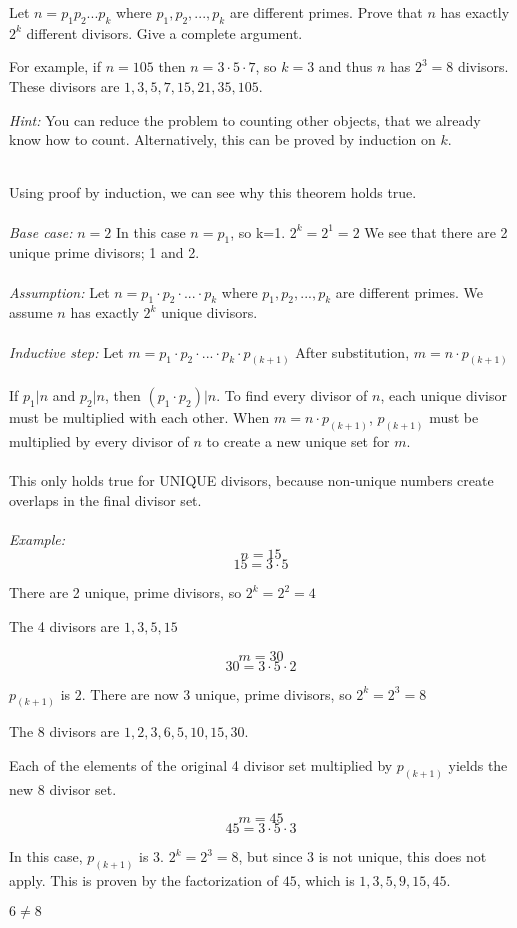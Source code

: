 

\begin{problem}
Let $n = p_1p_2...p_k$ where $p_1,p_2,...,p_k$ are different primes.	
Prove that $n$ has exactly $2^k$ different divisors. Give a complete argument.

For example, if $n =105$ then $n = 3\cdot 5 \cdot 7$, so $k=3$ and
thus $n$ has $2^3 = 8$ divisors. These divisors are $1,3,5,7,15,21,35,105$.

\emph{Hint:} You can reduce the problem to counting other objects, that we already
know how to count. Alternatively, this can be proved by induction on $k$.
\end{problem}

\begin{solution}
\\
Using proof by induction, we can see why this theorem holds true.
\\
\\
\emph{Base case:} $n=2$
In this case $n=p_1$, so k=1. $2^k = 2^1 = 2$ We see that there are 2 unique prime
divisors; 1 and 2.
\\
\\
\emph{Assumption: } Let $n = p_1 \cdot p_2 \cdot ... \cdot p_k$ where $p_1,p_2,...,p_k$ are different primes.
We assume $n$ has exactly $2^k$ unique divisors.
\\
\\
\emph{Inductive step: } Let $m = p_1 \cdot p_2 \cdot ... \cdot p_k \cdot p_{(k+1)}$
After substitution, $m = n \cdot p_{(k+1)}$
\\
\\
If $p_1 | n$ and $p_2 | n$, then $(p_1 \cdot p_2) | n$. To find every divisor of $n$, each unique divisor
must be multiplied with each other. When $m = n \cdot p_{(k+1)}$, $p_{(k+1)}$ must be multiplied by every
divisor of $n$ to create a new unique set for $m$.
\\
\\
This only holds true for UNIQUE divisors, because non-unique numbers create overlaps in the final divisor set.
\\
\\
\emph{Example:} 
\[n=15 \]
\[ 15 = 3 \cdot 5 \]

There are 2 unique, prime divisors, so $2^k = 2^2 = 4$

The 4 divisors are $1, 3, 5, 15$

\[m=30 \]
\[ 30 = 3 \cdot 5 \cdot 2 \]

$p_{(k+1)}$ is $2$. There are now 3 unique, prime divisors, so $2^k = 2^3 = 8$

The 8 divisors are $1, 2, 3, 6, 5, 10, 15, 30$.

Each of the elements of the original 4 divisor set multiplied by $p_{(k+1)}$ yields the new 8 divisor set.

\[m=45 \]
\[45 = 3 \cdot 5 \cdot 3 \]

In this case, $p_{(k+1)}$ is $3$.  $2^k = 2^3 = 8$, but since $3$ is not unique, this does not apply.
This is proven by the factorization of $45$, which is $1, 3, 5, 9, 15, 45$.

$6 \neq 8$
\end{solution}
